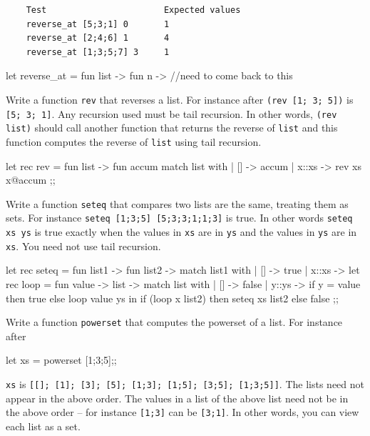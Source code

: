 \begin{Verbatim}
	Test                       Expected values
	reverse_at [5;3;1] 0       1
	reverse_at [2;4;6] 1       4
	reverse_at [1;3;5;7] 3     1
\end{Verbatim}


\ANSWER
\begin{answercode}
	let reverse_at = fun list -> fun n ->
		//need to come back to this 
\end{answercode}

\newpage
\nextq
Write a function \verb!rev! that reverses a list.
For instance after
\verb!(rev [1; 3; 5])!
is \verb![5; 3; 1]!.
Any recursion used must be tail recursion.
In other words,
\verb!(rev list)!
should call another function that returns the reverse of \verb!list!
and this function computes the reverse of
\verb!list! using tail recursion.

\ANSWER
\begin{answercode}
	let rec rev = fun list -> fun accum
	match list with
	| [] -> accum
	| x::xs -> rev xs x@accum
	;;
\end{answercode}

\newpage
\nextq
Write a function \verb!seteq! that compares two lists are the same,
treating them as sets.
For instance
\verb!seteq [1;3;5] [5;3;3;1;1;3]!
is true.
In other words
\verb!seteq xs ys! is true exactly when the values in \verb!xs!
are in \verb!ys! and the values in \verb!ys! are in \verb!xs!.
You need not use tail recursion.
\\
\ANSWER
\begin{answercode}
	let rec seteq = fun list1 -> fun list2 ->
		match list1 with
		| [] -> true
		| x::xs -> 
			let rec loop = fun value -> list ->
				match list with 
				| [] -> false
				| y::ys -> if y = value then
							true
						   else
						   	loop value ys
							in
			if (loop x list2) then
				seteq xs list2
			else
				false
	;;
\end{answercode}

\newpage
\nextq
Write a function \verb!powerset! that computes the powerset
of a list.
For instance after
\begin{console}
let xs = powerset [1;3;5];;
\end{console}
\verb!xs! is \verb![[]; [1]; [3]; [5]; [1;3]; [1;5]; [3;5]; [1;3;5]]!.
The lists need not appear in the above order.
The values in a list of the above list need not be in the above order --
for instance \verb![1;3]! can be \verb![3;1]!.
In other words, you can view each list as a set.


